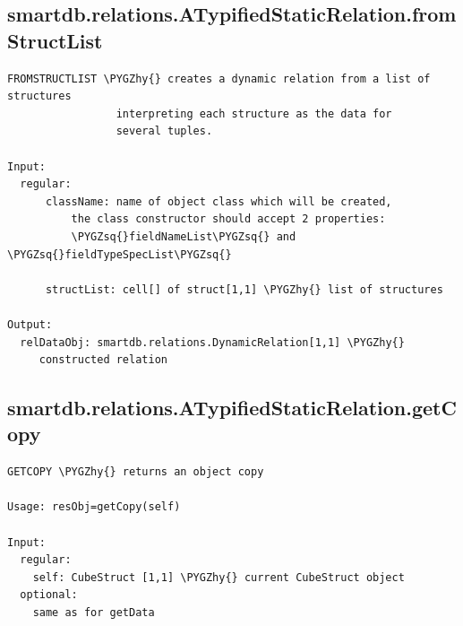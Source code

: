 \documentclass[letterpaper,10pt,english]{sphinxmanual}
\def\PYGZhy{\char`\-}
\def\PYGZsq{\char`\'}
\begin{document}
\subsection{smartdb.relations.ATypifiedStaticRelation.fromStructList}
\label{chap_functions:smartdb-relations-atypifiedstaticrelation-fromstructlist}
\begin{Verbatim}[commandchars=\\\{\}]
FROMSTRUCTLIST \PYGZhy{} creates a dynamic relation from a list of structures
                 interpreting each structure as the data for
                 several tuples.

Input:
  regular:
      className: name of object class which will be created,
          the class constructor should accept 2 properties:
          \PYGZsq{}fieldNameList\PYGZsq{} and \PYGZsq{}fieldTypeSpecList\PYGZsq{}

      structList: cell[] of struct[1,1] \PYGZhy{} list of structures

Output:
  relDataObj: smartdb.relations.DynamicRelation[1,1] \PYGZhy{}
     constructed relation
\end{Verbatim}


\subsection{smartdb.relations.ATypifiedStaticRelation.getCopy}
\label{chap_functions:smartdb-relations-atypifiedstaticrelation-getcopy}
\begin{Verbatim}[commandchars=\\\{\}]
GETCOPY \PYGZhy{} returns an object copy

Usage: resObj=getCopy(self)

Input:
  regular:
    self: CubeStruct [1,1] \PYGZhy{} current CubeStruct object
  optional:
    same as for getData
\end{Verbatim}
\end{document}
